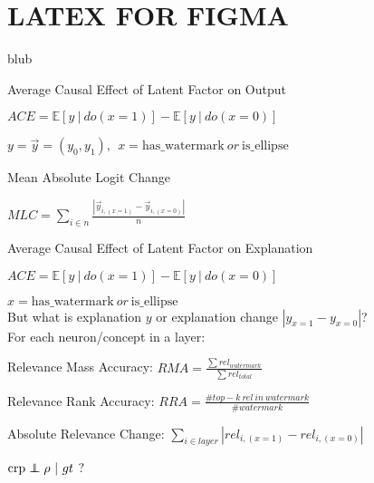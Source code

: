 


\section{LATEX FOR FIGMA}
blub
\begin{center}
    Average Causal Effect of Latent Factor on Output

    $\displaystyle ACE = \mathbb{E} [ y \ | \ do(x=1) ] - \mathbb{E} [ y \ | \ do(x=0) ]$
    \vspace{0.5cm}

    $y = \vec{y} = (y_0, y_1), \ \ x = \mathrm{has\_watermark} \ or \ \mathrm{is\_ellipse}$
    \vspace{0.5cm}

    Mean Absolute Logit Change

    $\displaystyle MLC = \sum_{i \in n} \frac{|\vec{y}_{i, (x=1)}- \vec{y}_{i, (x=0)} |}{n}$


\end{center}


\begin{center}
    Average Causal Effect of Latent Factor on Explanation

    $\displaystyle ACE = \mathbb{E} [ y \ | \ do(x=1) ] - \mathbb{E} [ y \ | \ do(x=0) ]$
    \vspace{0.5cm}
    
    $x = \mathrm{has\_watermark} \ or \ \mathrm{is\_ellipse}$ \\
    But what is explanation $y$ or explanation change $|y_{x=1} - y_{x=0}|$?  \\
    For each neuron/concept in a layer: 
    \vspace{0.4cm}

    Relevance Mass Accuracy: $\displaystyle RMA = \frac{\sum rel_{watermark}}{\sum rel_{total}}$
    \vspace{0.4cm}

    Relevance Rank Accuracy: $\displaystyle RRA = \frac{\# top-k \ rel \ in \ watermark}{\# watermark}$
    \vspace{0.4cm}

    Absolute Relevance Change: $\displaystyle \sum_{i \in layer} |rel_{i, (x=1)}- rel_{i, (x=0)} | $
    \vspace{0.4cm}

    $\mathrm{crp}  \independent \rho \ | \ gt $ ?


\end{center}